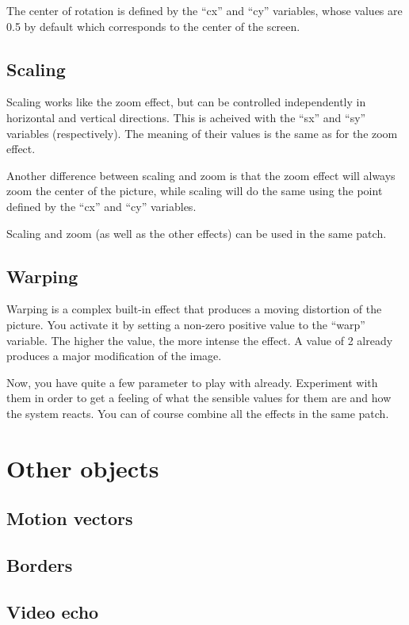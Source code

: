 \documentclass[11pt, a5paper, pagesize]{scrbook}
\begin{document}
The center of rotation is defined by the ``cx'' and ``cy'' variables, whose values are 0.5 by default which corresponds to the center of the screen.

\subsection{Scaling}
Scaling works like the zoom effect, but can be controlled independently in horizontal and vertical directions. This is acheived with the ``sx'' and ``sy'' variables (respectively). The meaning of their values is the same as for the zoom effect.

Another difference between scaling and zoom is that the zoom effect will always zoom the center of the picture, while scaling will do the same using the point defined by the ``cx'' and ``cy'' variables.

Scaling and zoom (as well as the other effects) can be used in the same patch.

\subsection{Warping}
Warping is a complex built-in effect that produces a moving distortion of the picture. You activate it by setting a non-zero positive value to the ``warp'' variable. The higher the value, the more intense the effect. A value of 2 already produces a major modification of the image.

Now, you have quite a few parameter to play with already. Experiment with them in order to get a feeling of what the sensible values for them are and how the system reacts. You can of course combine all the effects in the same patch.

\section{Other objects}
\subsection{Motion vectors}

\subsection{Borders}

\subsection{Video echo}
\end{document}
